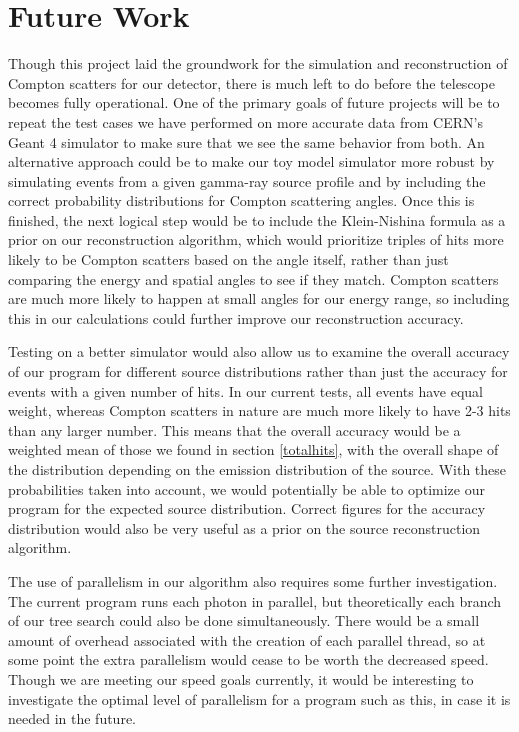 \section{Future Work}
Though this project laid the groundwork for the simulation and reconstruction of Compton scatters for our detector, there is much left to do before the telescope becomes fully operational. One of the primary goals of future projects will be to repeat the test cases we have performed on more accurate data from CERN's Geant 4 simulator to make sure that we see the same behavior from both. An alternative approach could be to make our toy model simulator more robust by simulating events from a given gamma-ray source profile and by including the correct probability distributions for Compton scattering angles. Once this is finished, the next logical step would be to include the Klein-Nishina formula as a prior on our reconstruction algorithm, which would prioritize triples of hits more likely to be Compton scatters based on the angle itself, rather than just comparing the energy and spatial angles to see if they match. Compton scatters are much more likely to happen at small angles for our energy range, so including this in our calculations could further improve our reconstruction accuracy.

Testing on a better simulator would also allow us to examine the overall accuracy of our program for different source distributions rather than just the accuracy for events with a given number of hits. In our current tests, all events have equal weight, whereas Compton scatters in nature are much more likely to have 2-3 hits than any larger number. This means that the overall accuracy would be a weighted mean of those we found in section \ref{totalhits}, with the overall shape of the distribution depending on the emission distribution of the source. With these probabilities taken into account, we would potentially be able to optimize our program for the expected source distribution. Correct figures for the accuracy distribution would also be very useful as a prior on the source reconstruction algorithm.

The use of parallelism in our algorithm also requires some further investigation. The current program runs each photon in parallel, but theoretically each branch of our tree search could also be done simultaneously. There would be a small amount of overhead associated with the creation of each parallel thread, so at some point the extra parallelism would cease to be worth the decreased speed. Though we are meeting our speed goals currently, it would be interesting to investigate the optimal level of parallelism for a program such as this, in case it is needed in the future. 